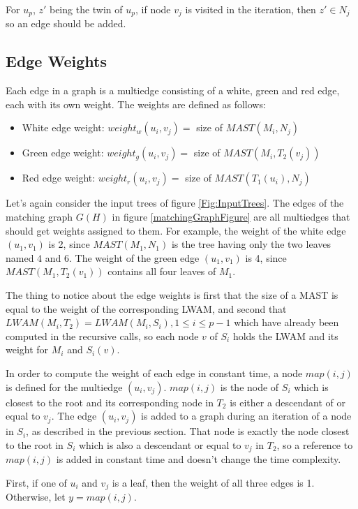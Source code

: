 For $u_p$, $z'$ being the twin of $u_p$, if node $v_j$ is visited in the iteration, then $z' \in N_j$ so an edge should be added.

\subsection{Edge Weights}
Each edge in a graph is a multiedge consisting of a white, green and red edge, each with its own weight. The weights are defined as follows:
\begin{itemize}
	\item White edge weight: $weight_w(u_i, v_j)=$ size of $MAST(M_i,N_j)$
	\item Green edge weight: $weight_g(u_i, v_j)=$ size of $MAST(M_i,T_2(v_j))$
	\item Red edge weight: $weight_r(u_i, v_j)=$ size of $MAST(T_1(u_i),N_j)$
\end{itemize}

Let's again consider the input trees of figure \ref{Fig:InputTrees}. The edges of the matching graph $G(H)$ in figure \ref{matchingGraphFigure} are all multiedges that should get weights assigned to them. For example, the weight of the white edge $(u_1, v_1)$ is 2, since $MAST(M_1,N_1)$ is the tree having only the two leaves named $4$ and $6$. The weight of the green edge $(u_1, v_1)$ is 4, since $MAST(M_1,T_2(v_1))$ contains all four leaves of $M_1$.

The thing to notice about the edge weights is first that the size of a MAST is equal to the weight of the corresponding LWAM, and second that $LWAM(M_i, T_2) = LWAM(M_i, S_i), 1 \le i \le p-1$ which have already been computed in the recursive calls, so each node $v$ of $S_i$ holds the LWAM and its weight for $M_i$ and $S_i(v)$.

In order to compute the weight of each edge in constant time, a node $map(i,j)$ is defined for the multiedge $(u_i,v_j)$. $map(i,j)$ is the node of $S_i$ which is closest to the root and its corresponding node in $T_2$ is either a descendant of or equal to $v_j$. The edge $(u_i,v_j)$ is added to a graph during an iteration of a node in $S_i$, as described in the previous section. That node is exactly the node closest to the root in $S_i$ which is also a descendant or equal to $v_j$ in $T_2$, so a reference to $map(i,j)$ is added in constant time and doesn't change the time complexity.

First, if one of $u_i$ and $v_j$ is a leaf, then the weight of all three edges is 1. Otherwise, let $y=map(i,j)$.

